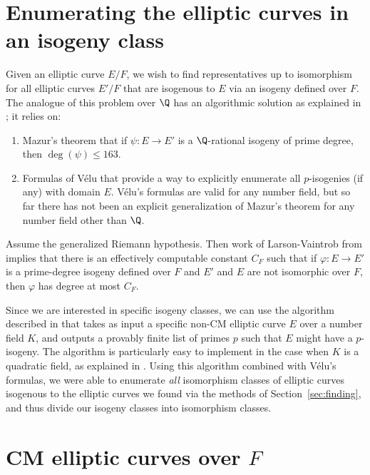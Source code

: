 \documentclass{amsart}
\begin{document}
\section{Enumerating the elliptic curves in an isogeny class}\label{sec:isoclass}

Given an elliptic curve $E/F$, we wish to find representatives up to isomorphism
for all elliptic curves $E'/F$ that are isogenous
to $E$ via an isogeny defined over $F$. The analogue of this problem
over $\Q$ has an algorithmic solution as explained in
\cite[\S3.8]{cremona:algs}; it relies on:
\begin{enumerate}
\item  Mazur's theorem \cite{mazur:rational} 
that if $\psi:E\to E'$ is a $\Q$-rational isogeny of prime degree, 
then $\deg(\psi)\leq 163$.
\item Formulas of V\'elu \cite{velu:isogenies} 
that provide a way to explicitly enumerate all $p$-isogenies (if any) with domain $E$.  
V\'elu's formulas are valid for any number field, but so far there has not been an explicit
generalization of Mazur's theorem for any number field other than $\Q$. 
\end{enumerate}

\begin{remark}
  Assume the generalized Riemann hypothesis.  Then work of Larson-Vaintrob 
  from \cite{larson-vaintrob} implies that there is an effectively computable constant $C_F$ 
  such that if $\varphi: E \to E'$ is a prime-degree isogeny defined over $F$ and
  $E'$ and $E$ are not isomorphic over $F$, then $\varphi$ has degree at most $C_F$.
\end{remark}

Since we are interested in specific isogeny classes, 
we can use the algorithm described in \cite{billerey:isog} that takes as
input a specific non-CM elliptic curve $E$ over a number field $K$, and
outputs a provably finite list of primes $p$ such that $E$ might have a
$p$-isogeny. The algorithm is particularly easy to implement in the
case when $K$ is a quadratic field, as explained in
\cite[\S2.3.4]{billerey:isog}.  Using this algorithm combined with
V\'elu's formulas, we were able to enumerate {\em all}
isomorphism classes of elliptic curves isogenous to the elliptic curves we found via the
methods of Section~\ref{sec:finding}, and thus divide our isogeny classes into
isomorphism classes.


\section{CM elliptic curves over $F$}\label{sec:cm}
\end{document}
